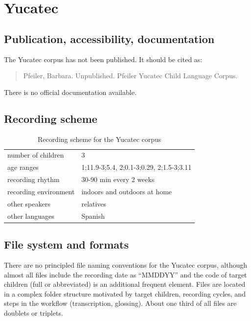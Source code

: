 \documentclass[a4paper, 11pt]{book}
\begin{document}
\section{Yucatec}
\label{sec:Yucatec}

\subsection{Publication, accessibility, documentation}

The Yucatec corpus \citep{Pfeiler2015a} has not been published. It should be cited as:

\begin{quote}
	Pfeiler, Barbara. Unpublished. Pfeiler Yucatec Child Language Corpus.
\end{quote}

\noindent There is no official documentation available. 


\subsection{Recording scheme}

\begin{table}[ht]
	\centering
	\begin{tabular}{ll}
		\toprule
		number of children 	& 3 \\
		age ranges 			& 1;11.9-3;5.4, 2;0.1-3;0.29, 2;1.5-3;3.11 \\
		recording rhythm 	& 30-90 min every 2 weeks \\
		recording environment & indoors and outdoors at home \\
		other speakers 		& relatives \\
		other languages		& Spanish \\
		\bottomrule
	\end{tabular}
	\caption{Recording scheme for the Yucatec corpus}
	\label{tab:Yucatec recording scheme}
\end{table}


\subsection{File system and formats}
\label{subsec: Yucatec file system and formats}

There are no principled file naming conventions for the Yucatec corpus, although almost all files include the recording date as “MMDDYY” and the code of target children (full or abbreviated) is an additional frequent element. Files are located in a complex folder structure motivated by target children, recording cycles, and steps in the workflow (transcription, glossing). About one third of all files are doublets or triplets.
\end{document}
